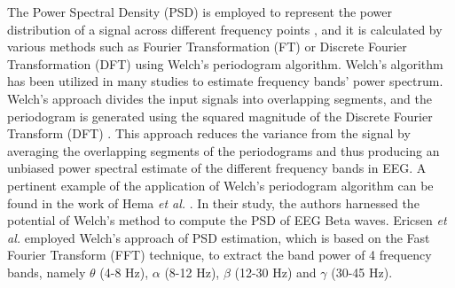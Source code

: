 {The Power Spectral Density (PSD) is employed to represent the power distribution of a signal across different frequency points \cite{zhang2021review}, and it is calculated by various methods such as Fourier Transformation (FT) or Discrete Fourier
Transformation (DFT) using Welch's periodogram algorithm. Welch's algorithm has been utilized in many studies to estimate frequency bands' power spectrum. Welch's approach divides the input signals into overlapping segments, and the periodogram is generated using the squared magnitude of the Discrete Fourier Transform (DFT) \cite{survey_brain_biometrics}. This approach reduces the variance from the signal by averaging the overlapping segments of the periodograms \cite{Welch_method} and thus producing an unbiased power spectral estimate of the different frequency bands in EEG. A pertinent example of the application of Welch's periodogram algorithm can be found in the work of Hema \textit{et al.} \cite{hema2008brain}. In their study, the authors harnessed the potential of Welch's method to compute the PSD of EEG Beta waves. Ericsen \textit{et al.} \cite{thomas2017eeg} employed Welch's approach of PSD estimation, which is based on the Fast Fourier Transform (FFT) technique, to extract the band power of 4 frequency bands, namely $\theta$ (4-8 Hz), $\alpha$ (8-12 Hz), $\beta$ (12-30 Hz) and $\gamma$ (30-45 Hz).


}
